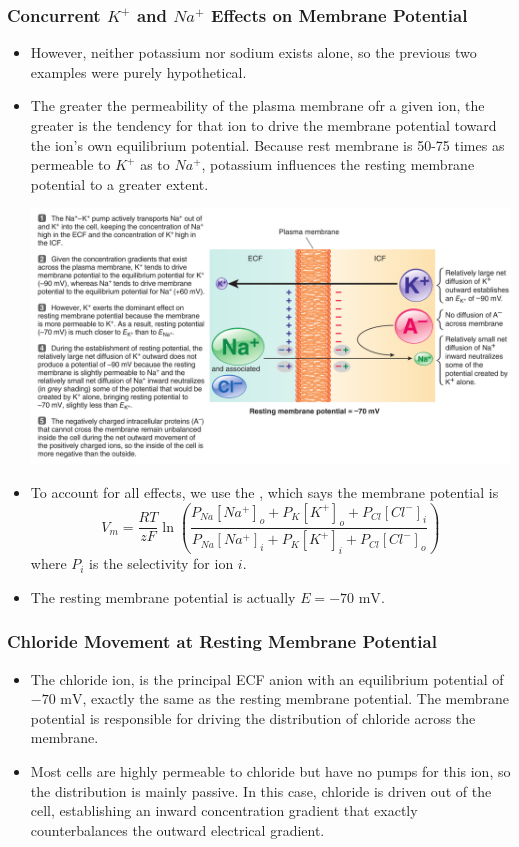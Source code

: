 \documentclass{article}
\numberwithin{equation}{section}
\begin{document}
\subsubsection{Concurrent \texorpdfstring{$K^+$}{K+} and \texorpdfstring{$Na^+$}{Na+} Effects on Membrane Potential}
\begin{itemize}
    \item However, neither potassium nor sodium exists alone, so the previous two examples were purely hypothetical. 
    \item The greater the permeability of the plasma membrane ofr a given ion, the greater is the tendency for that ion to drive the membrane potential toward the ion's own equilibrium potential. Because rest membrane is 50-75 times as permeable to $K^+$ as to $Na^+$, potassium influences the resting membrane potential to a greater extent.
    \begin{center}
        \includegraphics[width=0.8\linewidth]{figures/potassium_sodium_equilibrium.png}
    \end{center}
    \item To account for all effects, we use the , which says the membrane potential is
    \begin{equation}
        V_m = \frac{RT}{zF}\ln\left(\frac{P_{Na}[Na^+]_o+P_K[K^+]_o+P_{Cl}[Cl^-]_i}{P_{Na}[Na^+]_i+P_K[K^+]_i+P_{Cl}[Cl^-]_o}\right)
    \end{equation}
    where $P_i$ is the selectivity for ion $i$.
    \item The resting membrane potential is actually $E=-70\text{ mV}.$
\end{itemize}
\subsubsection{Chloride Movement at Resting Membrane Potential}
\begin{itemize}
    \item The chloride ion, is the principal ECF anion with an equilibrium potential of $-70\text{ mV}$, exactly the same as the resting membrane potential. The membrane potential is responsible for driving the distribution of chloride across the membrane.
    \item Most cells are highly permeable to chloride but have no pumps for this ion, so the distribution is mainly passive. In this case, chloride is driven out of the cell, establishing an inward concentration gradient that exactly counterbalances the outward electrical gradient.
\end{itemize}
\end{document}

